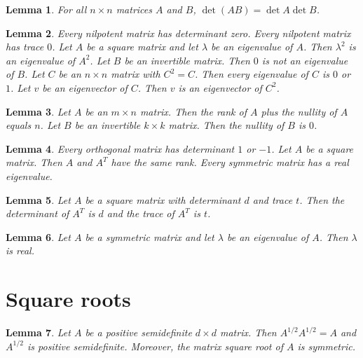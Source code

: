 \documentclass{article}
\newtheorem{lemma}{Lemma}
\begin{document}
\begin{lemma}\label{for-all-formula-noun}
For all $n\times n$ matrices $A$ and $B$, $\det(AB)=\det A\det B$.
\end{lemma}

\begin{lemma}\label{eigenvalues}
Every nilpotent matrix has determinant zero. Every nilpotent matrix has trace $0$. Let $A$ be a square matrix and let $\lambda$ be an eigenvalue of $A$. Then $\lambda^2$ is an eigenvalue of $A^2$. Let $B$ be an invertible matrix. Then $0$ is not an eigenvalue of $B$. Let $C$ be an $n\times n$ matrix with $C^2=C$. Then every eigenvalue of $C$ is $0$ or $1$. Let $v$ be an eigenvector of $C$. Then $v$ is an eigenvector of $C^2$.
\end{lemma}

\begin{lemma}\label{rank-nullity}
Let $A$ be an $m\times n$ matrix. Then the rank of $A$ plus the nullity of $A$ equals $n$. Let $B$ be an invertible $k\times k$ matrix. Then the nullity of $B$ is $0$.
\end{lemma}

\begin{lemma}\label{values-and-same}
Every orthogonal matrix has determinant $1$ or $-1$. Let $A$ be a square matrix. Then $A$ and $A^T$ have the same rank. Every symmetric matrix has a real eigenvalue.
\end{lemma}

\begin{lemma}\label{with-notions}
Let $A$ be a square matrix with determinant $d$ and trace $t$. Then the determinant of $A^T$ is $d$ and the trace of $A^T$ is $t$.
\end{lemma}

\begin{lemma}\label{real-of-real}
Let $A$ be a symmetric matrix and let $\lambda$ be an eigenvalue of $A$. Then $\lambda$ is real.
\end{lemma}

\section{Square roots}

\begin{lemma}\label{square-root}
Let $A$ be a positive semidefinite $d\times d$ matrix. Then $A^{1/2}A^{1/2}=A$ and $A^{1/2}$ is positive semidefinite. Moreover, the matrix square root of $A$ is symmetric.
\end{lemma}
\end{document}
